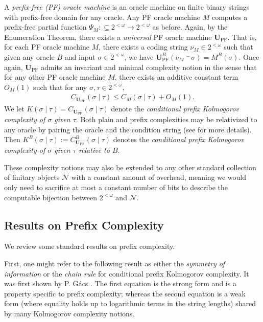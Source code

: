 A \textit{prefix-free (PF) oracle machine} is an oracle machine on finite binary strings with prefix-free domain for any oracle. Any PF oracle machine $M$ computes a prefix-free partial function $\Psi_M :\subseteq 2^{<\omega} \to 2^{<\omega}$ as before. Again, by the Enumeration Theorem, there exists a \textit{universal} PF oracle machine $\mathbf{U}_{\operatorname{PF}}$. That is, for each PF oracle machine $M$, there exists a coding string $\nu_M \in 2^{<\omega}$ such that given any oracle $B$ and input $\sigma \in 2^{<\omega}$, we have $\mathbf{U}_{\operatorname{PF}}^B(\nu_M\ ^\smallfrown \sigma) = M^B(\sigma)$. Once again, $\mathbf{U}_{\operatorname{PF}}$ admits an invariant and minimal complexity notion in the sense that for any other PF oracle machine $M$, there exists an additive constant term $O_M(1)$ such that for any $\sigma, \tau \in 2^{<\omega}$,
\begin{align*}
    C_{\mathbf{U}_{\operatorname{PF}}}(\sigma \mid \tau) \leq C_M(\sigma \mid \tau) + O_M(1).
\end{align*}
We let $K(\sigma \mid \tau) = C_{\mathbf{U}_{\operatorname{PF}}}(\sigma \mid \tau)$ denote the \textit{conditional prefix Kolmogorov complexity of $\sigma$ given $\tau$}.  Both plain and prefix complexities may be relativized to any oracle by pairing the oracle and the condition string (see \cite{DH10} for more details). Then $K^B(\sigma \mid \tau) := C^B_{\mathbf{U}_{\operatorname{PF}}}(\sigma \mid \tau)$ denotes the \textit{conditional prefix Kolmogorov complexity of $\sigma$ given $\tau$ relative to $B$}. 

These complexity notions may also be extended to any other standard collection of finitary objects $\mathscr{N}$ with a constant amount of overhead, meaning we would only need to sacrifice at most a constant number of bits to describe the computable bijection between $2^{<\omega}$ and $\mathscr{N}$.

\subsection{Results on Prefix Complexity}

We review some standard results on prefix complexity.

First, one might refer to the following result as either the \textit{symmetry of information} or the \textit{chain rule} for conditional prefix Kolmogorov complexity. It was first shown by P. G{\'a}cs \cite{Gac74}. The first equation is the strong form and is a property specific to prefix complexity; whereas the second equation is a weak form (where equality holds up to logarithmic terms in the string lengths) shared by many Kolmogorov complexity notions. 

